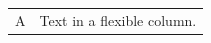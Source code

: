 \documentclass{standalone}
\begin{document}
\begin{tabularx}{6cm}{lX}A&Text in a flexible column.\end{tabularx}
\end{document}
